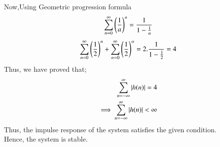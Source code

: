 \documentclass[journal,12pt,twocolumn]{IEEEtran}
\begin{document}
Now,Using Geometric progression formula 
\begin{align}
\sum_{n=0}^{\infty}\left(\frac{1}{a}\right)^{n} = \frac{1}{1-\frac{1}{a}}
\end{align}
\begin{align}
\sum_{n=0}^{\infty}\left(\frac{1}{2}\right)^{n} + \sum_{\alpha=0}^{\infty}\left(\frac{1}{2}\right)^{\alpha} = 2 . \frac{1}{1-\frac{1}{2}}=4\\ 
\end{align}
Thus, we have proved that;
\begin{align}
\sum_{n=-\infty}^{\infty} \left\vert h(n)\right\vert = 4\\
\implies \sum_{n=-\infty}^{\infty} \left\vert h(n)\right\vert < \infty\\
\end{align}
Thus, the impulse response of the system satisfies the given condition.\\
Hence, the system is stable.
\end{document}

